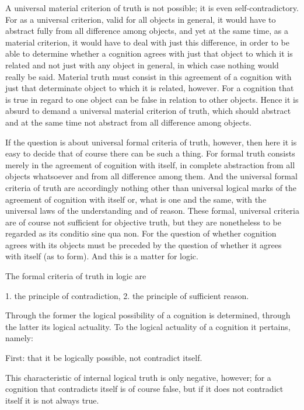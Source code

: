 A universal material criterion of truth is not possible;
it is even self-contradictory.
For as a universal criterion,
valid for all objects in general,
it would have to abstract fully
from all difference among objects,
and yet at the same time,
as a material criterion,
it would have to deal with just this difference,
in order to be able to determine whether a cognition agrees
with just that object to which it is related
and not just with any object in general,
in which case nothing would really be said.
Material truth must consist in
this agreement of a cognition
with just that determinate object
to which it is related, however.
For a cognition that is true in regard to one object
can be false in relation to other objects.
Hence it is absurd to demand
a universal material criterion of truth,
which should abstract and at the same time not abstract
from all difference among objects.

If the question is about
universal formal criteria of truth, however,
then here it is easy to decide that
of course there can be such a thing.
For formal truth consists merely in
the agreement of cognition with itself,
in complete abstraction from all objects whatsoever
and from all difference among them.
And the universal formal criteria of truth are
accordingly nothing other than universal logical marks of
the agreement of cognition with itself
or, what is one and the same,
with the universal laws of the understanding and of reason.
These formal, universal criteria are of course
not sufficient for objective truth,
but they are nonetheless to be regarded
as its conditio sine qua non.
For the question of whether
cognition agrees with its objects
must be preceded by the question of whether
it agrees with itself (as to form).
And this is a matter for logic.

The formal criteria of truth in logic are

1. the principle of contradiction,
2. the principle of sufficient reason.

Through the former the logical possibility of a cognition is determined,
through the latter its logical actuality.
To the logical actuality of a cognition it pertains, namely:

First: that it be logically possible, not contradict itself.

    This characteristic of internal logical truth is only negative, however;
    for a cognition that contradicts itself is of course false,
    but if it does not contradict itself it is not always true.

